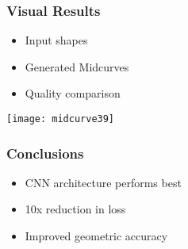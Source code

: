 \begin{frame}[fragile]\frametitle{Visual Results}

	\begin{itemize}
	\item Input shapes
	\item Generated Midcurves
	\item Quality comparison
	\end{itemize}

\begin{center}
\texttt{[image: midcurve39]}
\end{center}	
\end{frame}

\begin{frame}[fragile]\frametitle{Conclusions}

	\begin{itemize}
	\item CNN architecture performs best
	\item 10x reduction in loss
	\item Improved geometric accuracy
	\end{itemize}

\end{frame}